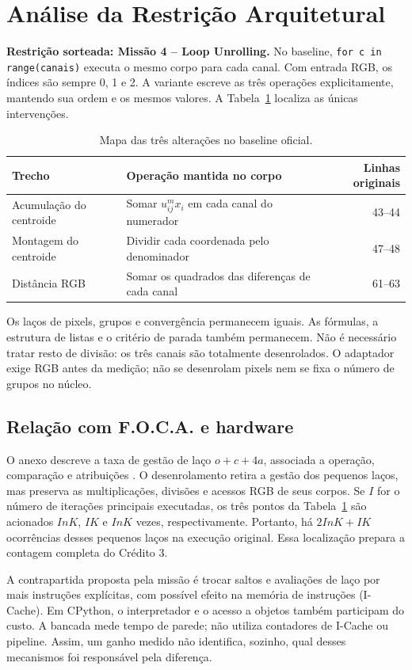 \documentclass[11pt,a4paper]{article}
\begin{document}
\section{Análise da Restrição Arquitetural}
\textbf{Restrição sorteada: Missão 4 -- Loop Unrolling.}
No baseline, \texttt{for c in range(canais)} executa o mesmo corpo para cada
canal. Com entrada RGB, os índices são sempre 0, 1 e 2. A variante escreve
as três operações explicitamente, mantendo sua ordem e os mesmos valores.
A Tabela~\ref{tab:alvos} localiza as únicas intervenções.

\begin{table}[htbp]\centering\small
\caption{Mapa das três alterações no baseline oficial.}\label{tab:alvos}
\begin{tabular}{@{}lp{7.1cm}r@{}}\toprule
Trecho & Operação mantida no corpo & Linhas originais\\\midrule
Acumulação do centroide & Somar $u_{ij}^{m}x_i$ em cada canal do numerador & 43--44\\
Montagem do centroide & Dividir cada coordenada pelo denominador & 47--48\\
Distância RGB & Somar os quadrados das diferenças de cada canal & 61--63\\
\bottomrule\end{tabular}
\end{table}

Os laços de pixels, grupos e convergência permanecem iguais. As fórmulas,
a estrutura de listas e o critério de parada também permanecem.
Não é necessário tratar resto de divisão: os três canais são totalmente
desenrolados. O adaptador exige RGB antes da medição; não se desenrolam
pixels nem se fixa o número de grupos no núcleo.

\subsection{Relação com F.O.C.A. e hardware}
O anexo descreve a taxa de gestão de laço $o+c+4a$, associada a operação,
comparação e atribuições \cite{missao}. O desenrolamento retira a gestão dos
pequenos laços, mas preserva as multiplicações, divisões e acessos RGB de seus
corpos. Se $I$ for o número de iterações principais executadas, os três pontos
da Tabela~\ref{tab:alvos} são acionados $InK$, $IK$ e $InK$ vezes,
respectivamente. Portanto, há $2InK+IK$ ocorrências desses pequenos laços
na execução original. Essa localização prepara a contagem completa do Crédito 3.

A contrapartida proposta pela missão é trocar saltos e avaliações de laço
por mais instruções explícitas, com possível efeito na memória de instruções
(I-Cache). Em CPython, o interpretador e o acesso a objetos também participam
do custo. A bancada mede tempo de parede; não utiliza contadores de I-Cache
ou pipeline. Assim, um ganho medido não identifica, sozinho, qual desses
mecanismos foi responsável pela diferença.
\end{document}
